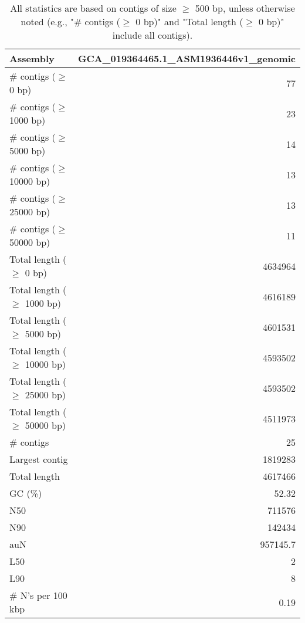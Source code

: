 \documentclass[12pt,a4paper]{article}
\begin{document}
\begin{table}[ht]
\begin{center}
\caption{All statistics are based on contigs of size $\geq$ 500 bp, unless otherwise noted (e.g., "\# contigs ($\geq$ 0 bp)" and "Total length ($\geq$ 0 bp)" include all contigs).}
\begin{tabular}{|l*{1}{|r}|}
\hline
Assembly & GCA\_019364465.1\_ASM1936446v1\_genomic \\ \hline
\# contigs ($\geq$ 0 bp) & 77 \\ \hline
\# contigs ($\geq$ 1000 bp) & 23 \\ \hline
\# contigs ($\geq$ 5000 bp) & 14 \\ \hline
\# contigs ($\geq$ 10000 bp) & 13 \\ \hline
\# contigs ($\geq$ 25000 bp) & 13 \\ \hline
\# contigs ($\geq$ 50000 bp) & 11 \\ \hline
Total length ($\geq$ 0 bp) & 4634964 \\ \hline
Total length ($\geq$ 1000 bp) & 4616189 \\ \hline
Total length ($\geq$ 5000 bp) & 4601531 \\ \hline
Total length ($\geq$ 10000 bp) & 4593502 \\ \hline
Total length ($\geq$ 25000 bp) & 4593502 \\ \hline
Total length ($\geq$ 50000 bp) & 4511973 \\ \hline
\# contigs & 25 \\ \hline
Largest contig & 1819283 \\ \hline
Total length & 4617466 \\ \hline
GC (\%) & 52.32 \\ \hline
N50 & 711576 \\ \hline
N90 & 142434 \\ \hline
auN & 957145.7 \\ \hline
L50 & 2 \\ \hline
L90 & 8 \\ \hline
\# N's per 100 kbp & 0.19 \\ \hline
\end{tabular}
\end{center}
\end{table}
\end{document}
